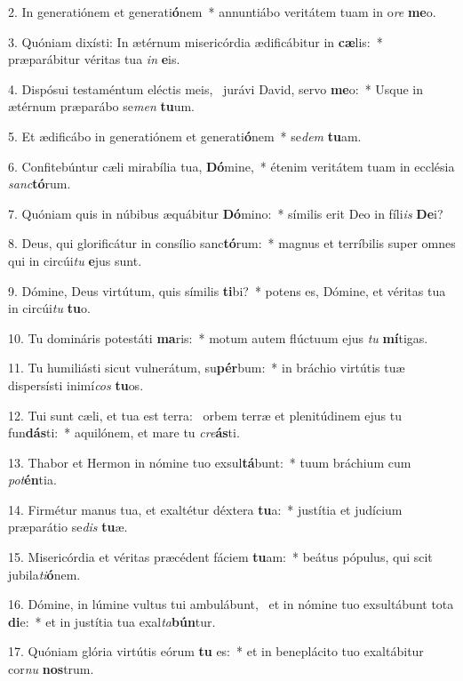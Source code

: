 2. In generatiónem et generati\textbf{ó}nem~*  annuntiábo veritátem tuam in o\textit{re} \textbf{me}o.\

3. Quóniam dixísti: In ætérnum misericórdia ædificábitur in \textbf{cæ}lis:~*  præparábitur véritas tua \textit{in} \textbf{e}is.\

4. Dispósui testaméntum eléctis meis, \dag\  jurávi David, servo \textbf{me}o:~*  Usque in ætérnum præparábo se\textit{men} \textbf{tu}um.\

5. Et ædificábo in generatiónem et generati\textbf{ó}nem~*  se\textit{dem} \textbf{tu}am.\

6. Confitebúntur cæli mirabília tua, \textbf{Dó}mine,~*  étenim veritátem tuam in ecclésia \textit{sanc}\textbf{tó}rum.\

7. Quóniam quis in núbibus æquábitur \textbf{Dó}mino:~*  símilis erit Deo in fíli\textit{is} \textbf{De}i?\

8. Deus, qui glorificátur in consílio sanc\textbf{tó}rum:~*  magnus et terríbilis super omnes qui in circúi\textit{tu} \textbf{e}jus sunt.\

9. Dómine, Deus virtútum, quis símilis \textbf{ti}bi?~*  potens es, Dómine, et véritas tua in circúi\textit{tu} \textbf{tu}o.\

10. Tu domináris potestáti \textbf{ma}ris:~*  motum autem flúctuum ejus \textit{tu} \textbf{mí}tigas.\

11. Tu humiliásti sicut vulnerátum, su\textbf{pér}bum:~*  in bráchio virtútis tuæ dispersísti inimí\textit{cos} \textbf{tu}os.\

12. Tui sunt cæli, et tua est terra: \dag\  orbem terræ et plenitúdinem ejus tu fun\textbf{dás}ti:~*  aquilónem, et mare tu \textit{cre}\textbf{ás}ti.\

13. Thabor et Hermon in nómine tuo exsul\textbf{tá}bunt:~*  tuum bráchium cum \textit{pot}\textbf{én}tia.\

14. Firmétur manus tua, et exaltétur déxtera \textbf{tu}a:~*  justítia et judícium præparátio se\textit{dis} \textbf{tu}æ.\

15. Misericórdia et véritas præcédent fáciem \textbf{tu}am:~*  beátus pópulus, qui scit jubila\textit{ti}\textbf{ó}nem.\

16. Dómine, in lúmine vultus tui ambulábunt, \dag\  et in nómine tuo exsultábunt tota \textbf{di}e:~*  et in justítia tua exal\textit{ta}\textbf{bún}tur.\

17. Quóniam glória virtútis eórum \textbf{tu} es:~*  et in beneplácito tuo exaltábitur cor\textit{nu} \textbf{nos}trum.\

